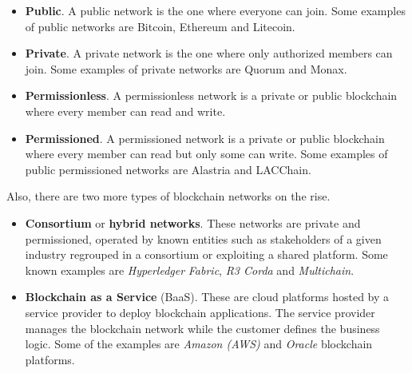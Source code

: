 \documentclass[a4paper, 12pt]{article} %
\begin{document}
            \begin{itemize}
                \item \textbf{Public}. A public network is the one where everyone can join. Some examples of public networks are Bitcoin, Ethereum and Litecoin.
                \item \textbf{Private}. A private network is the one where only authorized members can join. Some examples of private networks are Quorum and Monax.
                \item \textbf{Permissionless}. A permissionless network is a private or public blockchain where every member can read and write.
                \item \textbf{Permissioned}. A permissioned network is a private or public blockchain where every member can read but only some can write. Some examples of public permissioned networks are Alastria and LACChain.
            \end{itemize}          
            Also, there are two more types of blockchain networks on the rise.
            \begin{itemize}
                \item \textbf{Consortium} or \textbf{hybrid networks}. These networks are private and permissioned, operated by known entities such as stakeholders of a given industry regrouped in a consortium or exploiting a shared platform. Some known examples are \textit{Hyperledger} \textit{Fabric}, \textit{R3 Corda} and \textit{Multichain}.
                \item \textbf{Blockchain as a Service} (BaaS). These are cloud platforms hosted by a service provider to deploy blockchain applications. The service provider manages the blockchain network while the customer defines the business logic. Some of the examples are \textit{Amazon (AWS)} and \textit{Oracle} blockchain platforms.
            \end{itemize}
            
\end{document}
